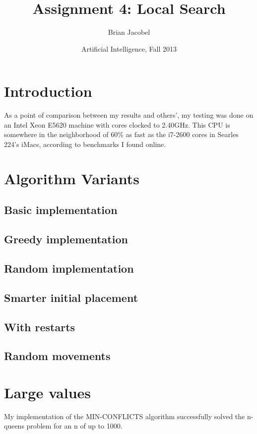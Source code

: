 \documentclass{article}
\title{Assignment 4: Local Search}
\author{Brian Jacobel}
\date{Artificial Intelligence, Fall 2013}
\begin{document}
\maketitle

\begin{doublespace}

\section{Introduction}
As a point of comparison between my results and others', my testing was done on an Intel Xeon E5620 machine with cores clocked to 2.40GHz. This CPU is somewhere in the neighborhood of 60\% as fast as the i7-2600 cores in Searles 224's iMacs, according to benchmarks I found online.

\section{Algorithm Variants}
\subsection{Basic implementation}
\subsection{Greedy implementation}
\subsection{Random implementation}

\subsection{Smarter initial placement}

\subsection{With restarts}

\subsection{Random movements}

\section{Large values}
My implementation of the MIN-CONFLICTS algorithm successfully solved the n-queens problem for an n of up to 1000. 

\newpage





\end{doublespace}
\end{document}
